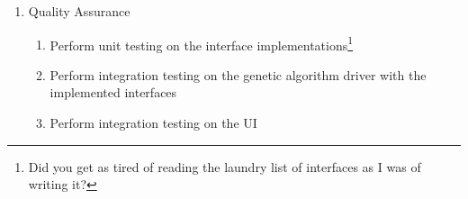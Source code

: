 \documentclass[letterpaper, 12pt]{article}
\begin{document}
\begin{enumerate}
\begin{enumerate}
\begin{itemize}
				\item\label{dev:i:genes} Genes
				\item\label{dev:i:chromosomes} Chromosomes
				\item\label{dev:i:individuals} Individuals
				\item\label{dev:i:population} Population
				\item\label{dev:i:mazes} Mazes
			 \end{itemize}
		  \item\label{dev:driver} Develop the genetic algorithm driver
		  \item\label{dev:implementInterfaces} Implement the interfaces for:
			 \begin{enumerate}
				\item\label{dev:fitness} Fitness\footnote{I recognize that this level of reference nesting is ridiculous. In spite of that, I will likely need to refer to these tasks individually in my weekly report, so I used it anyway.}
				\item\label{dev:selection} Selection
				\item\label{dev:breeding} Breeding
				\item\label{dev:mutation} Mutation
				\item\label{dev:optimization} Optimization
				\item\label{dev:genes} Genes
				\item\label{dev:chromosomes} Chromosomes
				\item\label{dev:individuals} Individuals
				\item\label{dev:population} Population
				\item\label{dev:mazes} Mazes
			 \end{enumerate}
		  \item\label{dev:UI}  Develop the UI
		\end{enumerate}
	 \item\label{quality} Quality Assurance
		\begin{enumerate}
		  \item\label{qa:interfaces} Perform unit testing on the interface implementations\footnote{Did you get as tired of reading the laundry list of interfaces as I was of writing it?}
		  \item\label{qa:int:driver} Perform integration testing on the genetic algorithm driver with the implemented interfaces
		  \item\label{qa:int:ui} Perform integration testing on the UI
		\end{enumerate}
  \end{enumerate}
\end{document}
